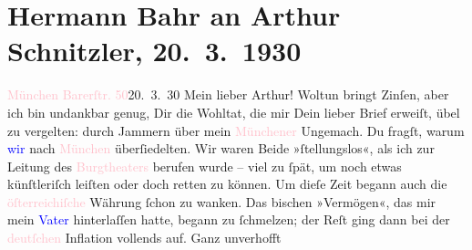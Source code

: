 

               \section[Hermann Bahr an Arthur Schnitzler, 20. 3. 1930]{ Hermann Bahr an Arthur Schnitzler, 20. 3. 1930}\nopagebreak{}\rehead{ }\normalsize\beginnumbering{} \toendnotes[C]{\smallbreak\pagebreak[2]} 
\toendnotes[C]{\smallbreak}\pstart
           \raggedleft{}{\pb}\textcolor{pink}{München Barerſtr. 50}{}\ledrightnote{\textcolor{pink}{Barerstraße}}{\\}20. 3. 30\pend
           \pstart{}Mein lieber Arthur!\pend\pstart
           Woltun bringt Zinſen, aber ich bin undankbar genug, Dir die Wohltat, die mir Dein
               lieber Brief erweiſt, übel zu vergelten: durch Jammern über mein \textcolor{pink}{Münchener}{}\ledrightnote{\textcolor{pink}{München}} Ungemach. Du fragſt, warum \textcolor{blue}{wir}{} nach \textcolor{pink}{München}{}\ledrightnote{\textcolor{pink}{München}} überſiedelten. Wir waren Beide »ſtellungslos«, als ich zur Leitung
               des \textcolor{pink}{Burgtheaters}{}\ledrightnote{\textcolor{pink}{Burgtheater}} berufen wurde – viel zu ſpät, um
               noch etwas künſtleriſch leiſten oder doch retten zu können. Um dieſe Zeit begann auch
               die \textcolor{pink}{öſterreichiſche}{}\ledrightnote{\textcolor{pink}{Österreich}} Währung ſchon zu wanken. Das
               bischen »Vermögen«, das mir mein \textcolor{blue}{Vater}{} hinterlaſſen hatte, begann zu ſchmelzen; der Reſt ging dann bei der
                  \textcolor{pink}{deutſchen}{}\ledrightnote{\textcolor{pink}{Deutschland}} Inflation vollends auf. Ganz unverhofft
